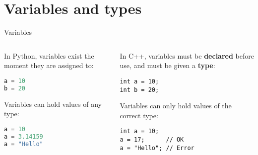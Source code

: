 \part{Variables and types}
\frame{\partpage}

\begin{frame}[fragile]{Variables}
	\begin{columns}[onlytextwidth]
		\begin{column}{0.45\textwidth}
			In Python, variables exist the moment they are assigned to:
			\begin{lstlisting}[language=Python]
a = 10
b = 20
			\end{lstlisting}
			\pause
			Variables can hold values of any type:
			\begin{lstlisting}[language=Python]
a = 10
a = 3.14159
a = "Hello"
			\end{lstlisting}
		\end{column}
		\pause
		\begin{column}{0.45\textwidth}
			In C++, variables must be \textbf{declared} before use, and must be given a \textbf{type}:
			\begin{lstlisting}
int a = 10;
int b = 20;
			\end{lstlisting}
			\pause
			Variables can only hold values of the correct type:
			\begin{lstlisting}
int a = 10;
a = 17;      // OK
a = "Hello"; // Error
			\end{lstlisting}
		\end{column}
	\end{columns}
\end{frame}
